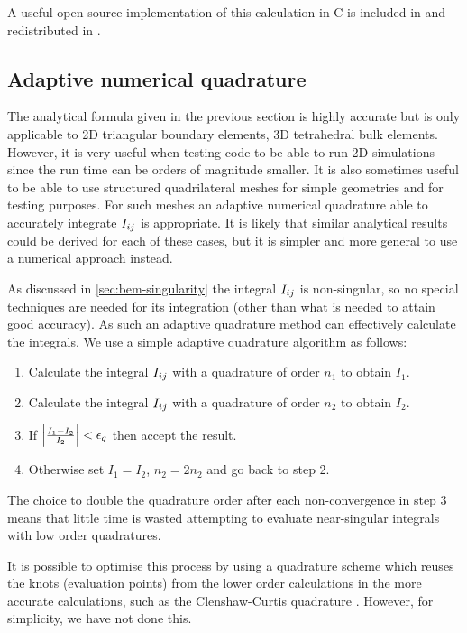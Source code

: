 A useful open source implementation of this calculation in C is included in \magpar \cite{magpar-website} and redistributed in \nmag \cite{nmag-website}.


\subsection{Adaptive numerical quadrature}

\newcommand{\tolq}{\epsilon_q}

The analytical formula given in the previous section is highly accurate but is only applicable to 2D triangular boundary elements, \ie 3D tetrahedral bulk elements.
However, it is very useful when testing code to be able to run 2D simulations since the run time can be orders of magnitude smaller.
It is also sometimes useful to be able to use structured quadrilateral meshes for simple geometries and for testing purposes.
For such meshes an adaptive numerical quadrature able to accurately integrate $I_{ij}$ is appropriate.
It is likely that similar analytical results could be derived for each of these cases, but it is simpler and more general to use a numerical approach instead.

As discussed in \cref{sec:bem-singularity} the integral $I_{ij}$ is non-singular, so no special techniques are needed for its integration (other than what is needed to attain good accuracy).
As such an adaptive quadrature method can effectively calculate the integrals.
We use a simple adaptive quadrature algorithm as follows:
\begin{enumerate}
\item Calculate the integral $I_{ij}$ with a quadrature of order $n_1$ to obtain $I_1$.
\item Calculate the integral $I_{ij}$ with a quadrature of order $n_2$ to obtain $I_2$.
\item If $\abs{\frac{I_1 - I_2}{I_2}} < \tolq$ then accept the result.
\item Otherwise set $I_1 = I_2$, $n_2 = 2n_2$ and go back to step 2.
\end{enumerate}
The choice to double the quadrature order after each non-convergence in step 3 means that little time is wasted attempting to evaluate near-singular integrals with low order quadratures.

It is possible to optimise this process by using a quadrature scheme which reuses the knots (\ie evaluation points) from the lower order calculations in the more accurate calculations, such as the Clenshaw-Curtis quadrature \cite{Trefethen2008}.
However, for simplicity, we have not done this.

